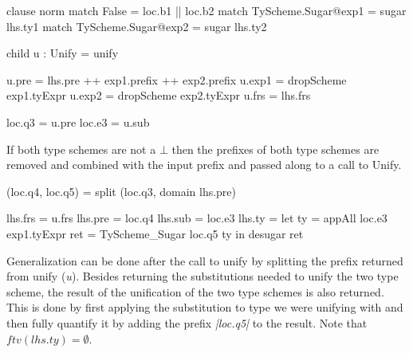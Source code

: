 \begin{code}
clause norm
    match False = loc.b1 || loc.b2
    match TyScheme.Sugar@exp1 = sugar lhs.ty1
    match TyScheme.Sugar@exp2 = sugar lhs.ty2
        
    child u : Unify = unify
        
    u.pre   = lhs.pre ++ exp1.prefix ++ exp2.prefix
    u.exp1  = dropScheme exp1.tyExpr
    u.exp2  = dropScheme exp2.tyExpr
    u.frs   = lhs.frs
            
    loc.q3  = u.pre
    loc.e3  = u.sub
\end{code}
If both type schemes are not a $\bot$ then the prefixes of both type schemes are removed and combined with the input prefix and passed along to a call to Unify.

\begin{code}    
(loc.q4, loc.q5) = split (loc.q3, domain lhs.pre)
    
lhs.frs  = u.frs
lhs.pre  = loc.q4
lhs.sub  = loc.e3
lhs.ty   =  let  ty   = appAll loc.e3 exp1.tyExpr
                 ret  = TyScheme_Sugar loc.q5 ty
            in desugar ret
\end{code}
Generalization can be done after the call to unify by splitting the prefix returned from unify (\emph{u}). Besides returning the substitutions needed to unify the two type scheme, the result of the unification of the two type schemes is also returned. This is done by first applying the substitution to type we were unifying with and then fully quantify it by adding the prefix \emph{|loc.q5|} to the result. Note that $ftv(lhs.ty)=\emptyset$.
